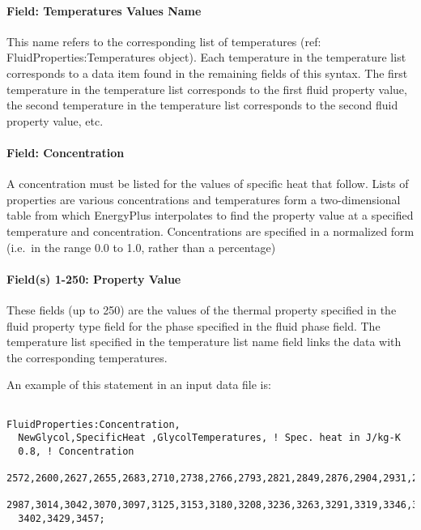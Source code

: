 \paragraph{Field: Temperatures Values Name}\label{field-temperatures-values-name-2}

This name refers to the corresponding list of temperatures (ref: FluidProperties:Temperatures object). Each temperature in the temperature list corresponds to a data item found in the remaining fields of this syntax. The first temperature in the temperature list corresponds to the first fluid property value, the second temperature in the temperature list corresponds to the second fluid property value, etc.

\paragraph{Field: Concentration}\label{field-concentration}

A concentration must be listed for the values of specific heat that follow. Lists of properties are various concentrations and temperatures form a two-dimensional table from which EnergyPlus interpolates to find the property value at a specified temperature and concentration. Concentrations are specified in a normalized form (i.e.~in the range 0.0 to 1.0, rather than a percentage)

\paragraph{Field(s) 1-250: Property Value}\label{fields-1-250-property-value-2}

These fields (up to 250) are the values of the thermal property specified in the fluid property type field for the phase specified in the fluid phase field. The temperature list specified in the temperature list name field links the data with the corresponding temperatures.

An example of this statement in an input data file is:

\begin{lstlisting}

FluidProperties:Concentration,
  NewGlycol,SpecificHeat ,GlycolTemperatures, ! Spec. heat in J/kg-K
  0.8, ! Concentration
  2572,2600,2627,2655,2683,2710,2738,2766,2793,2821,2849,2876,2904,2931,2959,
  2987,3014,3042,3070,3097,3125,3153,3180,3208,3236,3263,3291,3319,3346,3374,
  3402,3429,3457;
\end{lstlisting}

